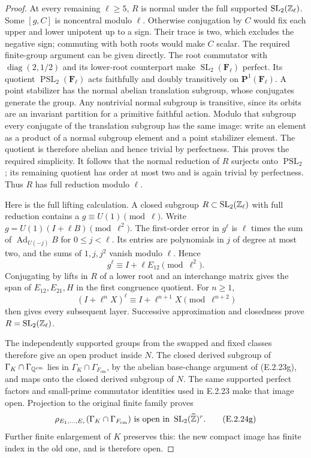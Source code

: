 \begin{proof}
At every remaining \(\ell\geq5\), \(R\) is normal
under the full supported \(\operatorname{SL}_2(\mathbb Z_\ell)\).
Some \([g,C]\) is noncentral modulo \(\ell\).
Otherwise conjugation by \(C\) would fix each upper and
lower unipotent up to a sign. Their trace is two, which
excludes the negative sign; commuting with both roots
would make \(C\) scalar.
The required finite-group argument can be given directly.
The root commutator with \(\operatorname{diag}(2,1/2)\)
and its lower-root counterpart make
\(\operatorname{SL}_2(\mathbf F_\ell)\) perfect.
Its quotient \(\operatorname{PSL}_2(\mathbf F_\ell)\)
acts faithfully and doubly transitively on
\(\mathbf P^1(\mathbf F_\ell)\). A point stabilizer
has the normal abelian translation subgroup, whose
conjugates generate the group. Any nontrivial normal
subgroup is transitive, since its orbits are an invariant
partition for a primitive faithful action. Modulo that
subgroup every conjugate of the translation subgroup has
the same image: write an element as a product of a normal
subgroup element and a point stabilizer element.
The quotient is therefore abelian and hence trivial by
perfectness. This proves the required simplicity.
It follows that the normal reduction of \(R\) surjects
onto \(\operatorname{PSL}_2\); its remaining quotient
has order at most two and is again trivial by perfectness.
Thus \(R\) has full reduction modulo \(\ell\).

Here is the full lifting calculation. A closed subgroup
\(R\subset\operatorname{SL}_2(\mathbb Z_\ell)\) with full
reduction contains a \(g\equiv U(1)\pmod\ell\).
Write \(g=U(1)(I+\ell B)\pmod{\ell^2}\).
The first-order error in \(g^\ell\) is \(\ell\)
times the sum of \(\operatorname{Ad}_{U(-j)}B\) for
\(0\leq j<\ell\). Its entries are polynomials in
\(j\) of degree at most two, and the sums of
\(1,j,j^2\) vanish modulo \(\ell\). Hence
\[
 g^\ell\equiv I+\ell E_{12}\pmod{\ell^2}.
 \tag{E.2.24f}
\]
Conjugating by lifts in \(R\) of a lower root and an
interchange matrix gives the span of
\(E_{12},E_{21},H\) in the first congruence quotient.
For \(n\geq1\),
\[
 (I+\ell^nX)^\ell
       \equiv I+\ell^{n+1}X\pmod{\ell^{n+2}}
\]
then gives every subsequent layer. Successive approximation
and closedness prove \(R=\operatorname{SL}_2(\mathbb Z_\ell)\).

The independently supported groups from the swapped and
fixed classes therefore give an open product inside \(N\).
The closed derived subgroup of
\(\Gamma_K\cap\Gamma_{\mathbb Q^{\mathrm{cm}}}\) lies in
\(\Gamma_K\cap\Gamma_{F_{\mathrm{cm}}}\), by the
abelian base-change argument of (E.2.23g), and maps onto
the closed derived subgroup of \(N\).
The same supported perfect factors and small-prime
commutator identities used in E.2.23 make that image open.
Projection to the original finite family proves
\[
 \rho_{E_1,\ldots,E_r}
       (\Gamma_K\cap\Gamma_{F_{\mathrm{cm}}})
   \text{ is open in }
       \operatorname{SL}_2(\widehat{\mathbb Z})^r.
 \tag{E.2.24g}
\]
Further finite enlargement of \(K\) preserves this:
the new compact image has finite index in the old one,
and is therefore open.


\end{proof}
